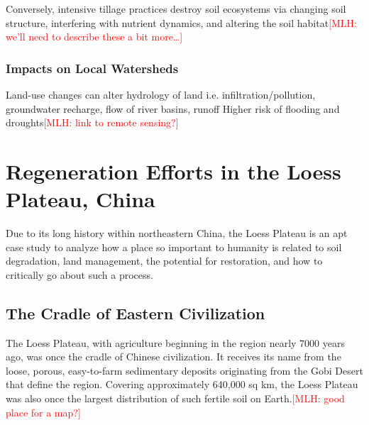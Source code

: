 \documentclass{book}\usepackage{knitr}
\newcommand{\red}[1]{\textcolor{red}{[MLH: #1]}}
\begin{document}
\begin{knitrout}
\begin{kframe}
Conversely, intensive tillage practices destroy soil ecosystems via changing soil structure, interfering with nutrient dynamics, and altering the soil habitat\red{we'll need to describe these a bit more\ldots}

\subsubsection{Impacts on Local Watersheds}
Land-use changes can alter hydrology of land i.e. infiltration/pollution, groundwater recharge, flow of river basins, runoff
Higher risk of flooding and droughts\red{link to remote sensing?}

\section{Regeneration Efforts in the Loess Plateau, China}

Due to its long history within northeastern China, the Loess Plateau is an apt case study to analyze how a place so important to humanity is related to soil degradation, land management, the potential for restoration, and how to critically go about such a process.

\subsection{The Cradle of Eastern Civilization}

The Loess Plateau, with agriculture beginning in the region nearly 7000 years ago, was once the cradle of Chinese civilization. It receives its name from the loose, porous, easy-to-farm sedimentary deposits originating from the Gobi Desert that define the region. Covering approximately 640,000 sq km, the Loess Plateau was also once the largest distribution of such fertile soil on Earth.\red{good place for a map?}


\end{kframe}
\end{knitrout}
\end{document}
